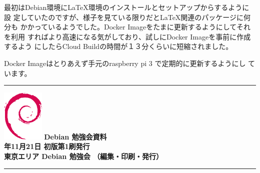 \documentclass[mingoth,a4paper]{jsarticle}
\newcommand{\debmtgyear}{2020}
\newcommand{\debmtgmonth}{11}
\newcommand{\debmtgdate}{21}
\begin{document}
最初はDebian環境にLaTeX環境のインストールとセットアップからするように設
定していたのですが、様子を見ている限りだとLaTeX関連のパッケージに何分も
かかっているようでした。Docker Imageをたまに更新するようにしてそれを利用
すればより高速になる気がしており、試しにDocker Imageを事前に作成するよう
にしたらCloud Buildの時間が１３分くらいに短縮されました。

Docker Imageはとりあえず手元のraspberry pi 3 で定期的に更新するようにし
ています。

\mbox{}\newpage
\mbox{}\newpage
\mbox{}\newpage

\vspace*{15cm}
\hrule
\vspace{2mm}
\includegraphics[width=2cm]{image200502/openlogo-nd.eps}
\noindent \Large \bf Debian 勉強会資料\\
\noindent \normalfont \debmtgyear{}年\debmtgmonth{}月\debmtgdate{}日 \hspace{5mm}  初版第1刷発行\\
\noindent \normalfont 東京エリア Debian 勉強会 （編集・印刷・発行）\\
\hrule
\end{document}
